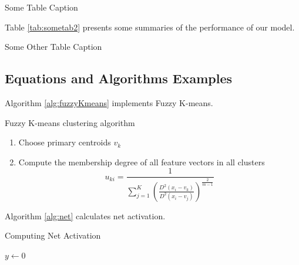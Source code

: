 \begin{table}[htbp]
\caption{Some Table Caption}
\label{tab:sometab1}
\resizebox{0.4\linewidth}{!}{}
\end{table}

Table \ref{tab:sometab2} presents some summaries of the performance of our model.

\begin{table}[htbp]
\caption{Some Other Table Caption}
\label{tab:sometab2}
\resizebox{0.9\linewidth}{!}{}
\end{table}

\subsection{Equations and Algorithms Examples}

Algorithm \ref{alg:fuzzyKmeans} implements Fuzzy K-means.

\begin{algorithm}
\caption{Fuzzy K-means clustering algorithm}
\label{alg:fuzzyKmeans}
\begin{enumerate}
    \item Choose primary centroids $v_{k}$
    \item Compute the membership degree of all feature vectors in all clusters
    \begin{equation}
    u_{ki}  = \frac{1}{ \sum_{j=1}^K ( \frac{D^{2}(x_{i} - v_{k})}{D^{2}(x_{i} - v_{j})})^\frac{2} 
    {m-1}}
    \label{eq:kmeans}
    \end{equation}
\end{enumerate}
\end{algorithm}

Algorithm \ref{alg:net} calculates net activation.


\begin{algorithm}
\caption{Computing Net Activation}
\label{alg:net}
{}
$y\leftarrow 0$\;
\end{algorithm}

